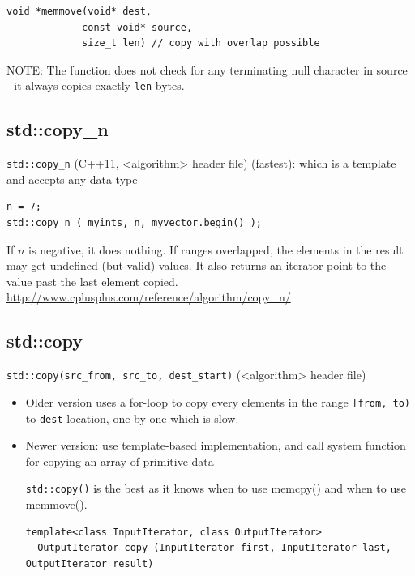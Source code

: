 \begin{lstlisting}
void *memmove(void* dest, 
             const void* source, 
             size_t len) // copy with overlap possible
\end{lstlisting}  
NOTE: The function does not check for any terminating null character in source -
it always copies exactly \verb!len! bytes.

\subsection{std::copy\_n}
\label{sec:std::copy_n}

\verb!std::copy_n! (C++11, <algorithm> header file) (fastest):
  which is a template and accepts any data type
\begin{verbatim}
n = 7;
std::copy_n ( myints, n, myvector.begin() );
\end{verbatim}    
If $n$ is negative, it does nothing. If ranges overlapped, the elements in the
result may get undefined (but valid) values. It also returns an iterator point
to the value past the last element copied.
\url{http://www.cplusplus.com/reference/algorithm/copy_n/} 


\subsection{std::copy}
\label{sec:std::copy}

\verb!std::copy(src_from, src_to, dest_start)! (<algorithm> header file) 
\begin{itemize}
  
   \item Older version uses a for-loop to copy every elements in the range
   \verb![from, to)! to \verb!dest! location, one by one which is slow.
   
     
   \item Newer version: use template-based implementation, and call system
   function for copying an array of primitive data
   
   \verb!std::copy()! is the best as it knows when to use memcpy() and 
   when to use memmove().

\begin{verbatim}
template<class InputIterator, class OutputIterator>
  OutputIterator copy (InputIterator first, InputIterator last, OutputIterator result)
\end{verbatim}
   
\end{itemize}



